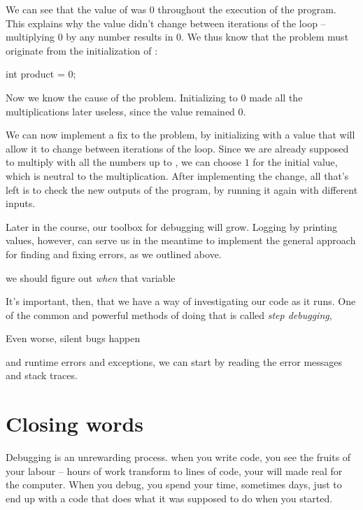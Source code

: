 We can see that the value of  was $0$ throughout the execution of the program. This explains why the value didn't change between iterations of the loop -- multiplying $0$ by any number results in $0$. We thus know that the problem must originate from the initialization of : 

\begin{code}
int product = 0;
\end{code}

Now we know the cause of the problem. Initializing  to $0$ made all the multiplications later useless, since the value remained $0$. 

We can now implement a fix to the problem, by initializing  with a value that will allow it to change between iterations of the loop. Since we are already supposed to multiply with all the numbers up to , we can choose $1$ for the initial value, which is neutral to the multiplication.  After implementing the change, all that's left is to check the new outputs of the program, by running it again with different inputs.

Later in the course, our toolbox for debugging will grow. Logging by printing values, however, can serve us in the meantime to implement the general approach for finding and fixing errors, as we outlined above.


we should figure out \emph{when} that variable 


It's important, then, that we have a way of investigating our code as it runs. One of the common and powerful methods of doing that is called \emph{step debugging}, 

Even worse, silent bugs happen 

and runtime errors and exceptions, we can start by reading the error messages and stack traces. 



\section{Closing words}

Debugging is an unrewarding process. when you write code, you see the fruits of your labour -- hours of work transform to lines of code, your will made real for the computer. When you debug, you spend your time, sometimes days, just to end up with a code that does what it was supposed to do when you started.

